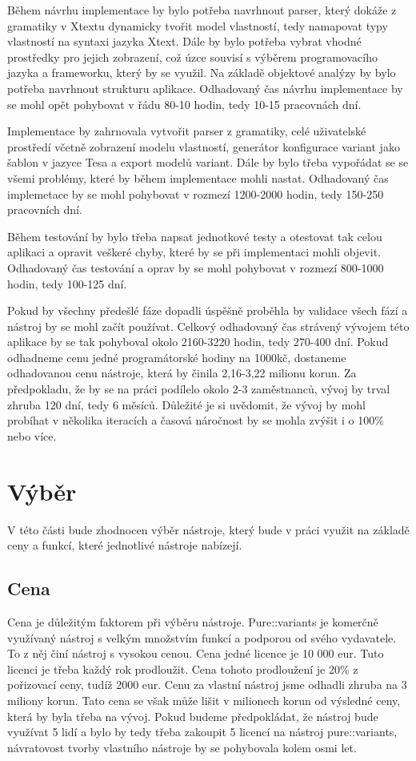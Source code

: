 Během návrhu implementace by bylo potřeba navrhnout parser, který dokáže z gramatiky v Xtextu dynamicky tvořit model vlastností, tedy namapovat typy vlastností na syntaxi jazyka Xtext. Dále by bylo potřeba vybrat vhodné prostředky pro jejich zobrazení, což úzce souvisí s výběrem programovacího jazyka a frameworku, který by se využil. Na základě objektové analýzy by bylo potřeba navrhnout strukturu aplikace. Odhadovaný čas návrhu implementace by se mohl opět pohybovat v řádu 80-10 hodin, tedy 10-15 pracovnách dní.

Implementace by zahrnovala vytvořit parser z gramatiky, celé uživatelské prostředí včetně zobrazení modelu vlastností, generátor konfigurace variant jako šablon v jazyce Tesa a export modelů variant. Dále by bylo třeba vypořádat se se všemi problémy, které by během implementace mohli nastat. Odhadovaný čas implemetace by se mohl pohybovat v rozmezí 1200-2000 hodin, tedy 150-250 pracovních dní. 

Během testování by bylo třeba napsat jednotkové testy a otestovat tak celou aplikaci a opravit veškeré chyby, které by se při implementaci mohli objevit. Odhadovaný čas testování a oprav by se mohl pohybovat v rozmezí 800-1000 hodin, tedy 100-125 dní.

Pokud by všechny předešlé fáze dopadli úspěšně proběhla by validace všech fází a nástroj by se mohl začít používat. Celkový odhadovaný čas strávený vývojem této aplikace by se tak pohyboval okolo 2160-3220 hodin, tedy 270-400 dní. Pokud odhadneme cenu jedné programátorské hodiny na 1000kč, dostaneme odhadovanou cenu nástroje, která by činila 2,16-3,22 milionu korun. Za předpokladu, že by se na práci podílelo okolo 2-3 zaměstnanců, vývoj by trval zhruba 120 dní, tedy 6 měsíců. Důležité je si uvědomit, že vývoj by mohl probíhat v několika iteracích a časová náročnost by se mohla zvýšit i o 100\% nebo více.

\section{Výběr}
V této části bude zhodnocen výběr nástroje, který bude v práci využit na základě ceny a funkcí, které jednotlivé nástroje nabízejí.

\subsection{Cena}
Cena je důležitým faktorem při výběru nástroje. Pure::variants je komerčně využívaný nástroj s velkým množstvím funkcí a podporou od svého vydavatele. To z něj činí nástroj s vysokou cenou. Cena jedné licence je 10 000 eur. Tuto licenci je třeba každý rok prodloužit. Cena tohoto prodloužení je 20\% z pořizovací ceny, tudíž 2000 eur. Cenu za vlastní nástroj jsme odhadli zhruba na 3 miliony korun. Tato cena se však může lišit v milionech korun od výsledné ceny, která by byla třeba na vývoj. Pokud budeme předpokládat, že nástroj bude využívat 5 lidí a bylo by tedy třeba zakoupit 5 licencí na nástroj pure::variants, návratovost tvorby vlastního nástroje by se pohybovala kolem osmi let.

